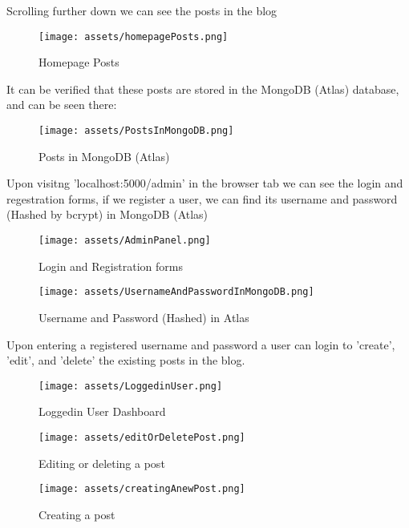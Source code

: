 \documentclass[12pt]{article}
\begin{document}
Scrolling further down we can see the posts in the blog

\begin{figure}[H]
    \centering
    \texttt{[image: assets/homepagePosts.png]}
    \caption{Homepage Posts}
    \label{fig:logo}
\end{figure}

\clearpage

It can be verified that these posts are stored in the MongoDB (Atlas) database, and can be seen there:

\begin{figure}[H]
    \centering
    \texttt{[image: assets/PostsInMongoDB.png]}
    \caption{Posts in MongoDB (Atlas)}
    \label{fig:logo}
\end{figure}

Upon visitng 'localhost:5000/admin' in the browser tab we can see the login and regestration forms, if we register a user, we can find its username and password (Hashed by bcrypt) in MongoDB (Atlas)

\begin{figure}[H]
    \centering
    \texttt{[image: assets/AdminPanel.png]}
    \caption{Login and Registration forms}
    \label{fig:logo}
\end{figure}

\begin{figure}[H]
    \centering
    \texttt{[image: assets/UsernameAndPasswordInMongoDB.png]}
    \caption{Username and Password (Hashed) in Atlas}
    \label{fig:logo}
\end{figure}

Upon entering a registered username and password a user can login to 'create', 'edit', and 'delete' the existing posts in the blog.

\begin{figure}[H]
    \centering
    \texttt{[image: assets/LoggedinUser.png]}
    \caption{Loggedin User Dashboard}
    \label{fig:logo}
\end{figure}

\begin{figure}[H]
    \centering
    \texttt{[image: assets/editOrDeletePost.png]}
    \caption{Editing or deleting a post}
    \label{fig:logo}
\end{figure}

\begin{figure}[H]
    \centering
    \texttt{[image: assets/creatingAnewPost.png]}
    \caption{Creating a post}
    \label{fig:logo}
\end{figure}
\end{document}
